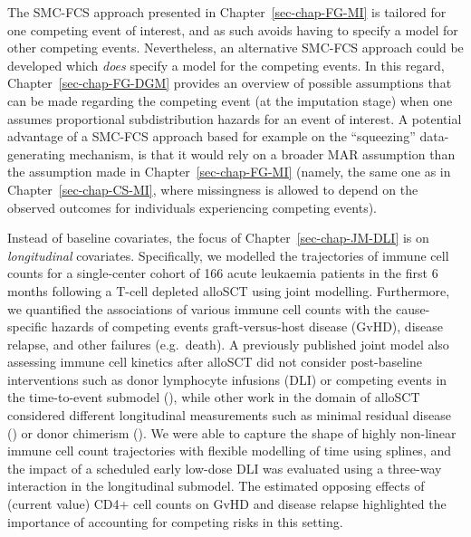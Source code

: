 \documentclass[
  letterpaper,
  paper=240mm:170mm,
  twoside=true,
  open=right,
  fontsize=10pt,
  pagesize=false,
  BCOR=15mm,
  DIV=14,
  headinclude=true,
  footinclude=false,
  headsepline=on]{scrbook}
\begin{document}
The SMC-FCS approach presented in Chapter~\ref{sec-chap-FG-MI} is
tailored for one competing event of interest, and as such avoids having
to specify a model for other competing events. Nevertheless, an
alternative SMC-FCS approach could be developed which \emph{does}
specify a model for the competing events. In this regard,
Chapter~\ref{sec-chap-FG-DGM} provides an overview of possible
assumptions that can be made regarding the competing event (at the
imputation stage) when one assumes proportional subdistribution hazards
for an event of interest. A potential advantage of a SMC-FCS approach
based for example on the ``squeezing'' data-generating mechanism, is
that it would rely on a broader MAR assumption than the assumption made
in Chapter~\ref{sec-chap-FG-MI} (namely, the same one as in
Chapter~\ref{sec-chap-CS-MI}, where missingness is allowed to depend on
the observed outcomes for individuals experiencing competing events).

Instead of baseline covariates, the focus of
Chapter~\ref{sec-chap-JM-DLI} is on \emph{longitudinal} covariates.
Specifically, we modelled the trajectories of immune cell counts for a
single-center cohort of 166 acute leukaemia patients in the first 6
months following a T-cell depleted alloSCT using joint modelling.
Furthermore, we quantified the associations of various immune cell
counts with the cause-specific hazards of competing events
graft-versus-host disease (GvHD), disease relapse, and other failures
(e.g.~death). A previously published joint model also assessing immune
cell kinetics after alloSCT did not consider post-baseline interventions
such as donor lymphocyte infusions (DLI) or competing events in the
time-to-event submodel
(), while other work in the domain of alloSCT
considered different longitudinal measurements such as minimal residual
disease () or donor chimerism
(). We were able to capture the shape of highly non-linear
immune cell count trajectories with flexible modelling of time using
splines, and the impact of a scheduled early low-dose DLI was evaluated
using a three-way interaction in the longitudinal submodel. The
estimated opposing effects of (current value) CD4+ cell counts on GvHD
and disease relapse highlighted the importance of accounting for
competing risks in this setting.
\end{document}
